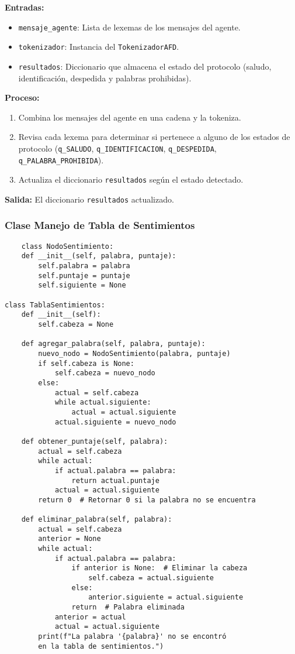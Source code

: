 \documentclass[12pt,a4paper]{article}
\begin{document}
\textbf{Entradas:}
\begin{itemize}
    \item \texttt{mensaje\_agente}: Lista de lexemas de los mensajes del agente.
    \item \texttt{tokenizador}: Instancia del \texttt{TokenizadorAFD}.
    \item \texttt{resultados}: Diccionario que almacena el estado del protocolo (saludo, identificación, despedida y palabras prohibidas).
\end{itemize}

\textbf{Proceso:}
\begin{enumerate}
    \item Combina los mensajes del agente en una cadena y la tokeniza.
    \item Revisa cada lexema para determinar si pertenece a alguno de los estados de protocolo (\texttt{q\_SALUDO}, \texttt{q\_IDENTIFICACION}, \texttt{q\_DESPEDIDA}, \texttt{q\_PALABRA\_PROHIBIDA}).
    \item Actualiza el diccionario \texttt{resultados} según el estado detectado.
\end{enumerate}

\textbf{Salida:} El diccionario \texttt{resultados} actualizado.
\subsubsection{Clase Manejo de Tabla de Sentimientos}
\begin{verbatim}
    class NodoSentimiento:
    def __init__(self, palabra, puntaje):
        self.palabra = palabra
        self.puntaje = puntaje
        self.siguiente = None

class TablaSentimientos:
    def __init__(self):
        self.cabeza = None

    def agregar_palabra(self, palabra, puntaje):
        nuevo_nodo = NodoSentimiento(palabra, puntaje)
        if self.cabeza is None:
            self.cabeza = nuevo_nodo
        else:
            actual = self.cabeza
            while actual.siguiente:
                actual = actual.siguiente
            actual.siguiente = nuevo_nodo

    def obtener_puntaje(self, palabra):
        actual = self.cabeza
        while actual:
            if actual.palabra == palabra:
                return actual.puntaje
            actual = actual.siguiente
        return 0  # Retornar 0 si la palabra no se encuentra

    def eliminar_palabra(self, palabra):
        actual = self.cabeza
        anterior = None
        while actual:
            if actual.palabra == palabra:
                if anterior is None:  # Eliminar la cabeza
                    self.cabeza = actual.siguiente
                else:
                    anterior.siguiente = actual.siguiente
                return  # Palabra eliminada
            anterior = actual
            actual = actual.siguiente
        print(f"La palabra '{palabra}' no se encontró 
        en la tabla de sentimientos.")

\end{verbatim}
\end{document}
